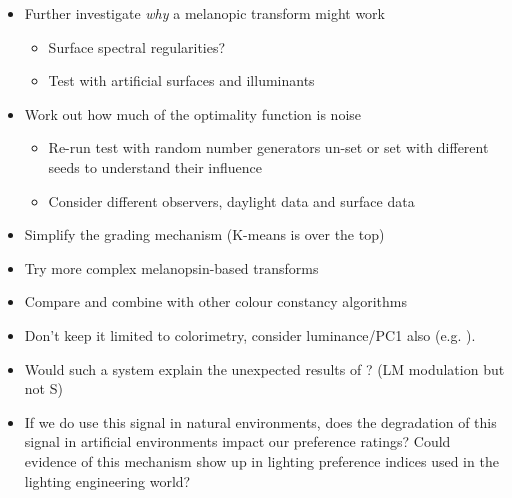 \begin{itemize}
\item Further investigate \emph{why} a melanopic transform might work
\begin{itemize}
\item Surface spectral regularities?
\item Test with artificial surfaces and illuminants
\end{itemize}
\item Work out how much of the optimality function is noise
\begin{itemize}
\item Re-run test with random number generators un-set or set with different seeds to understand their influence
\item Consider different observers, daylight data and surface data
\end{itemize}
\item Simplify the grading mechanism (K-means is over the top)
\item Try more complex melanopsin-based transforms
\item Compare and combine with other colour constancy algorithms
\item Don't keep it limited to colorimetry, consider luminance/PC1 also (e.g. \citet{chakrabarti_color_2015}). 
\item Would such a system explain the unexpected results of \citet{cao_evidence_2018}? (LM modulation but not S)
\item If we do use this signal in natural environments, does the degradation of this signal in artificial environments impact our preference ratings? Could evidence of this mechanism show up in lighting preference indices used in the lighting engineering world?
\end{itemize}




